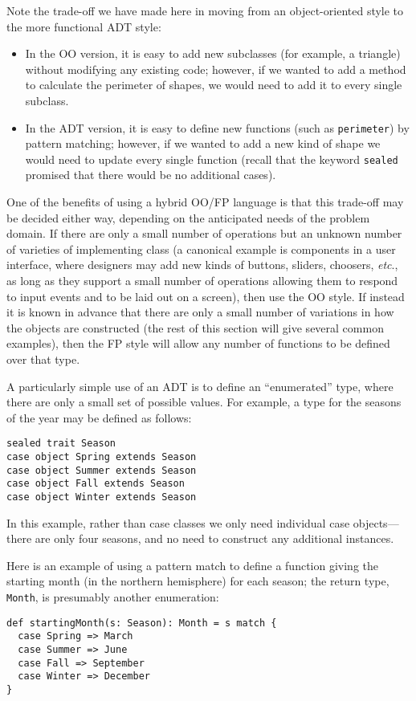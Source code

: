 Note the trade-off we have made here in moving from an object-oriented style to the more functional ADT style:
\begin{itemize}
\item In the OO version, it is easy to add new subclasses (for example, a triangle) without modifying any existing code; however, if we wanted to add a method to calculate the perimeter of shapes, we would need to add it to every single subclass.
\item In the ADT version, it is easy to define new functions (such as \texttt{perimeter}) by pattern matching; however, if we wanted to add a new kind of shape we would need to update every single function (recall that the keyword \texttt{sealed} promised that there would be no additional cases).
\end{itemize}
One of the benefits of using a hybrid OO/FP language is that this trade-off may be decided either way, depending on the anticipated needs of the problem domain. If there are only a small number of operations but an unknown number of varieties of implementing class (a canonical example is components in a user interface, where designers may add new kinds of buttons, sliders, choosers, \textit{etc}., as long as they support a small number of operations allowing them to respond to input events and to be laid out on a screen), then use the OO style. If instead it is known in advance that there are only a small number of variations in how the objects are constructed (the rest of this section will give several common examples), then the FP style will allow any number of functions to be defined over that type.

A particularly simple use of an ADT is to define an ``enumerated'' type, where there are only a small set of possible values. For example, a type for the seasons of the year may be defined as follows:
\begin{verbatim}
sealed trait Season
case object Spring extends Season
case object Summer extends Season
case object Fall extends Season
case object Winter extends Season
\end{verbatim}
In this example, rather than case classes we only need individual case objects---there are only four seasons, and no need to construct any additional instances.

Here is an example of using a pattern match to define a function giving the starting month (in the northern hemisphere) for each season; the return type, \texttt{Month}, is presumably another enumeration:
\begin{verbatim}
def startingMonth(s: Season): Month = s match {
  case Spring => March
  case Summer => June
  case Fall => September
  case Winter => December
}
\end{verbatim}

